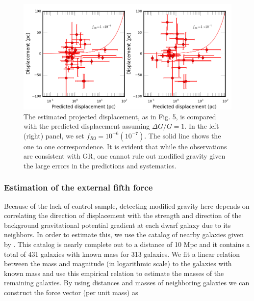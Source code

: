 \documentclass{emulateapj}
\begin{document}
\begin{figure}
\begin{center}
\includegraphics[scale=0.5]{figures/disppred.png}
  \caption{The estimated projected displacement, as in Fig. 5, is compared with the predicted displacement assuming $\Delta
G/G=1$. In the left (right) panel, we set $f_{R0}=10^{-6} (10^{-7})$. 
 The solid
line shows the one to one correspondence. It is evident that while 
the observations are consistent with
GR, one cannot rule out modified gravity 
given the large errors in the predictions and systematics.}
\label{fig:rgdisppred}
\end{center}
\end{figure}

\subsubsection{Estimation of the external fifth force}
Because of the lack of control sample, detecting modified gravity here
depends on correlating the direction of displacement with the strength
and direction of the background gravitational potential gradient at
each dwarf galaxy due to its neighbors.  In order to estimate this,
we use the
catalog of  nearby galaxies given by \citet{kar04}. This catalog is nearly
complete out to a distance of 10 Mpc and it contains a total of 431 galaxies
with known mass for 313 galaxies. We fit a linear relation between the
mass and magnitude (in logarithmic scale) to the galaxies with known mass and
use this empirical relation to estimate the masses of the remaining galaxies.
By using distances and masses of neighboring galaxies we can construct the
force vector (per unit mass) as 
\end{document}
